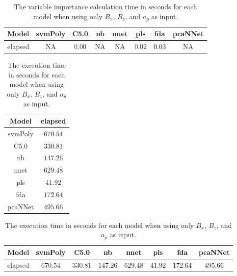 \begin{table}[!ht]
	\centering
	\begin{tabular}{|c|c|c|c|c|c|c|c|}
		\hline
		Model & svmPoly & C5.0 & nb & nnet & pls & fda & pcaNNet \\ \hline
		elapsed & NA & $0.00$ & NA & NA & $0.02$ & $0.03$ & NA \\ \hline
	\end{tabular}
	\caption{The variable importance calculation time in seconds for each model when using only $B_{x}$, $B_{z}$, and $a_{p}$ as input.}
	\label{tab:time:reverse:xzap:importance}
\end{table}

\begin{table}[!ht]
	\centering
	\begin{tabular}{|c|c|}
		\hline
		Model & elapsed \\ \hline
		svmPoly & $670.54$ \\ \hline
		C5.0 & $330.81$ \\ \hline
		nb & $147.26$ \\ \hline
		nnet & $629.48$ \\ \hline
		pls & $41.92$ \\ \hline
		fda & $172.64$ \\ \hline
		pcaNNet & $495.66$ \\ \hline
	\end{tabular}
	\caption{The execution time in seconds for each model when using only $B_{x}$, $B_{z}$, and $a_{p}$ as input.}
	\label{tab:time:xzap:total}
\end{table}

\begin{table}[!ht]
	\centering
	\begin{tabular}{|c|c|c|c|c|c|c|c|}
		\hline
		Model & svmPoly & C5.0 & nb & nnet & pls & fda & pcaNNet \\ \hline
		elapsed & $670.54$ & $330.81$ & $147.26$ & $629.48$ & $41.92$ & $172.64$ & $495.66$ \\ \hline
	\end{tabular}
	\caption{The execution time in seconds for each model when using only $B_{x}$, $B_{z}$, and $a_{p}$ as input.}
	\label{tab:time:reverse:xzap:total}
\end{table}

